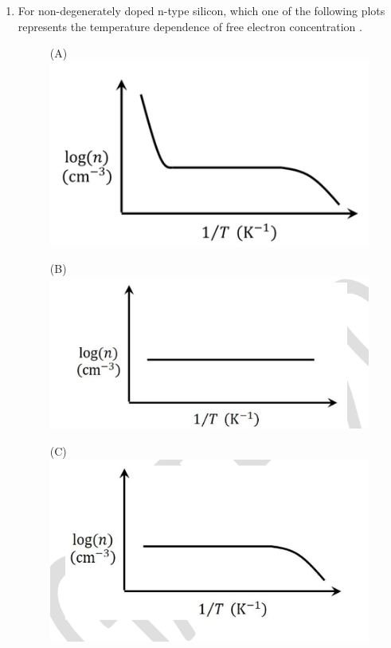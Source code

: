 \documentclass[journal,12pt,onecolumn]{IEEEtran}
\theoremstyle{remark}
\begin{document}
\begin{enumerate}
\item For non-degenerately doped n-type silicon, which one of the following plots represents the temperature  dependence of free electron concentration .
\hfill{}
\begin{figure}[H]
\centering
\begin{minipage}{0.45\textwidth}
    \centering
    (A) \includegraphics[width=0.9\linewidth]{q22a.png}
\end{minipage}
\begin{minipage}{0.45\textwidth}
    \centering
    (B) \includegraphics[width=0.9\linewidth]{q22b.png}
\end{minipage}
\begin{minipage}{0.45\textwidth}
    \centering
    (C) \includegraphics[width=0.9\linewidth]{q22c.png}

\end{minipage}
\end{figure}
\end{enumerate}
\end{document}
